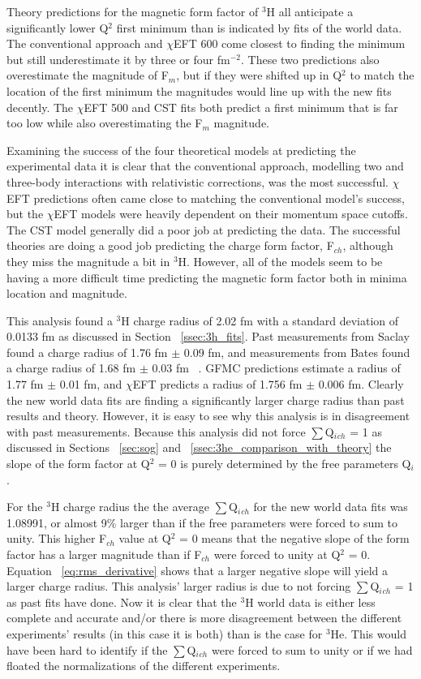 Theory predictions for the magnetic form factor of $^3$H all anticipate a significantly lower Q$^2$ first minimum than is indicated by fits of the world data. The conventional approach and $\chi$EFT 600 come closest to finding the minimum but still underestimate it by three or four fm$^{-2}$. These two predictions also overestimate the magnitude of F$_m$, but if they were shifted up in Q$^2$ to match the location of the first minimum the magnitudes would line up with the new fits decently. The $\chi$EFT 500 and CST fits both predict a first minimum that is far too low while also overestimating the F$_m$ magnitude. 

Examining the success of the four theoretical models at predicting the experimental data it is clear that the conventional approach, modelling two and three-body interactions with relativistic corrections, was the most successful. $\chi$EFT predictions often came close to matching the conventional model's success, but the $\chi$EFT models were heavily dependent on their momentum space cutoffs. The CST model generally did a poor job at predicting the data. The successful theories are doing a good job predicting the charge form factor, F$_{ch}$, although they miss the magnitude a bit in $^3$H. However, all of the models seem to be having a more difficult time predicting the magnetic form factor both in minima location and magnitude.

This analysis found a $^3$H charge radius of 2.02 fm with a standard deviation of 0.0133 fm as discussed in Section ~\ref{ssec:3h_fits}. Past measurements from Saclay found a charge radius of 1.76 fm $\pm$ 0.09 fm, and measurements from Bates found a charge radius of 1.68 fm $\pm$ 0.03 fm ~\cite{3h_proposal}. GFMC predictions estimate a radius of 1.77 fm $\pm$ 0.01 fm, and $\chi$EFT predicts a radius of 1.756 fm $\pm$ 0.006 fm. Clearly the new world data fits are finding a significantly larger charge radius than past results and theory. However, it is easy to see why this analysis is in disagreement with past measurements. Because this analysis did not force $\sum$Q$_i{_{ch}}$ = 1 as discussed in Sections ~\ref{sec:sog} and ~\ref{ssec:3he_comparison_with_theory} the slope of the form factor at Q$^2$ = 0 is purely determined by the free parameters Q$_i$. 

For the $^3$H charge radius the the average $\sum$Q$_i{_{ch}}$ for the new world data fits was 1.08991, or almost 9$\%$ larger than if the free parameters were forced to sum to unity. This higher F$_{ch}$ value at Q$^2$ = 0 means that the negative slope of the form factor has a larger magnitude than if F$_{ch}$ were forced to unity at Q$^2$ = 0. Equation ~\ref{eq:rms_derivative} shows that a larger negative slope will yield a larger charge radius. This analysis' larger radius is due to not forcing $\sum$Q$_i{_{ch}}$ = 1 as past fits have done. Now it is clear that the $^3$H world data is either less complete and accurate and/or there is more disagreement between the different experiments' results (in this case it is both) than is the case for $^3$He. This would have been hard to identify if the $\sum$Q$_i{_{ch}}$ were forced to sum to unity or if we had floated the normalizations of the different experiments.